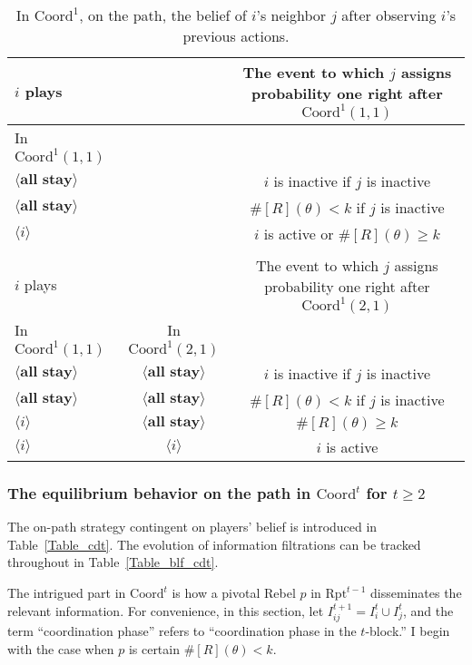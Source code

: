 \documentclass[12pt,letter]{article}
\newcommand{\Kappa}{\mathrm{Coord}}
\newcommand{\Omicron}{\mathrm{Rpt}}
\theoremstyle{definition}
\theoremstyle{remark}
\theoremstyle{claim}
\begin{document}
\begin{table}[!htbp]
\caption{In $\Kappa^1$, on the path, the belief of $i$'s neighbor $j$ after observing $i$'s previous actions.}
\label{Table_blf_cd0}
\begin{center}
\begin{tabular}{l  c | c}
 	$i$ plays	  			&	  &  The event to which $j$ assigns probability one  right after $\Kappa^1(1,1)$\\
\hline
\hline
In $\Kappa^1(1,1)$	&		&		  \\
\hline
  $\langle \textbf{all stay} \rangle$	& &   $i$ is inactive if $j$ is inactive \\
  $\langle \textbf{all stay} \rangle$	&  &  $\#[R](\theta)< k$ if $j$ is inactive\\
  $\langle i \rangle$	&	&  $i$ is active or $\#[R](\theta)\geq k$    \\
  \hline
  \\
 	$i$ plays	  	&  	  &The event to which $j$ assigns probability one  right after $\Kappa^1(2,1)$\\
\hline
\hline
	In $\Kappa^1(1,1)$		&			In $\Kappa^1(2,1)$	&  \\
\hline
  $\langle \textbf{all stay} \rangle$	&  $\langle \textbf{all stay} \rangle$ &  $i$ is inactive if $j$ is inactive \\
  $\langle \textbf{all stay} \rangle$	&  $\langle \textbf{all stay} \rangle$ &  $\#[R](\theta)< k$ if $j$ is inactive\\
  $\langle i \rangle$	&	$\langle \textbf{all stay} \rangle$ &  $\#[R](\theta)\geq k$    \\
  $\langle i \rangle$	&	$\langle i \rangle$ &  $i$ is active  \\
  \hline
\end{tabular}
\end{center}
\end{table}




\subsubsection{The equilibrium behavior on the path in $\Kappa^t$ for $t\geq 2$}
\label{sec:cdt}
The on-path strategy contingent on players' belief is introduced in Table~\ref{Table_cdt}. The evolution of information filtrations can be tracked throughout in Table~\ref{Table_blf_cdt}. 

The intrigued part in $\Kappa^t$ is how a pivotal Rebel $p$ in $\Omicron^{t-1}$ disseminates the relevant information. For convenience, in this section, let $I^{t+1}_{ij}=I^t_i\cup I^t_j$, and the term ``coordination phase'' refers to ``coordination phase in the $t$-block.'' I begin with the case when $p$ is certain $\#[R](\theta)< k$.
\end{document}
